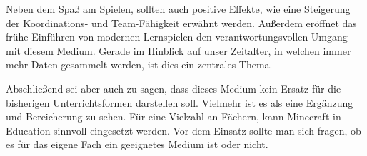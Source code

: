 Neben dem Spaß am Spielen, sollten auch positive Effekte, wie eine Steigerung der Koordinations- und Team-Fähigkeit erwähnt werden. Außerdem eröffnet das frühe Einführen von modernen Lernspielen den verantwortungsvollen Umgang mit diesem Medium. Gerade im Hinblick auf unser Zeitalter, in welchen immer mehr Daten gesammelt werden, ist dies ein zentrales Thema.

Abschließend sei aber auch zu sagen, dass dieses Medium kein Ersatz für die bisherigen Unterrichtsformen darstellen soll. Vielmehr ist es als eine Ergänzung und Bereicherung zu sehen. Für eine Vielzahl an Fächern, kann Minecraft in Education sinnvoll eingesetzt werden. Vor dem Einsatz sollte man sich fragen, ob es für das eigene Fach ein geeignetes Medium ist oder nicht.